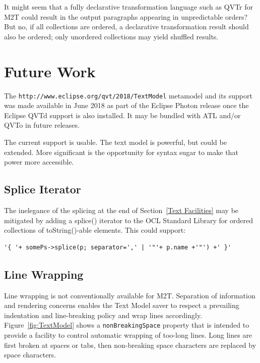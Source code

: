 \documentclass{llncs}
\begin{document}
It might seem that a fully declarative transformation language such as QVTr for M2T could result in the output paragraphs appearing in unpredictable orders? But no, if all collections are ordered, a declarative transformation result should also be ordered; only unordered collections may yield shuffled results.

\section{Future Work}\label{Future Work}

The \verb$http://www.eclipse.org/qvt/2018/TextModel$ metamodel and its support was made available in June 2018 as part of the Eclipse Photon release once the Eclipse QVTd support is also installed. It may be bundled with ATL and/or QVTo in future releases.

The current support is usable. The text model is powerful, but could be extended. More significant is the opportunity for syntax sugar to make that power more accessible.

\subsection{Splice Iterator}

The inelegance of the splicing at the end of Section~\ref{Text Facilities} may be mitigated by adding a splice() iterator to the OCL Standard Library for ordered collections of toString()-able elements. This could support:

\begin{verbatim}
'{ '+ somePs->splice(p; separator=',' | '"'+ p.name +'"') +' }'
\end{verbatim}

\subsection{Line Wrapping}\label{Line Wrapping}

Line wrapping is not conventionally available for M2T. Separation of information and rendering concerns enables the Text Model saver to respect a prevailing indentation and line-breaking policy and wrap lines accordingly. Figure~\ref{fig:TextModel}  shows a \verb$nonBreakingSpace$ property that is intended to provide a facility to control automatic wrapping of too-long lines. Long lines are first broken at spaces or tabs, then non-breaking space characters are replaced by space characters.
\end{document}
